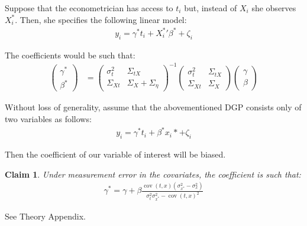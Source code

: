 \documentclass[10pt]{article}
\makeatletter
\newtheorem{claim}{Claim}
\renewenvironment{proof}[1][\proofname] {\par\pushQED{\qed}\normalfont\topsep6\p@\@plus6\p@\relax\trivlist\item[\hskip\labelsep\bfseries#1\@addpunct{.}]\ignorespaces}{\popQED\endtrivlist\@endpefalse}
\makeatother
\begin{document}
        Suppose that the econometrician has access to $t_i$ but, instead of $X_i$ she observes $X^*_i$. Then, she specifies the following linear model:
        \begin{align}
            y_i = \gamma^* t_i + {X^{*}_i}' \beta^* + \zeta_i
        \end{align}
        
        The coefficients would be such that:
        \begin{align} \label{mismeasured_coeffs}
            \left(\begin{array}{l}
        {\gamma}^* \\
        {\beta}^*
        \end{array}\right)
        & =\left(\begin{array}{cc}
        {\sigma}^2_{t} & \Sigma_{tX} \\
        \Sigma_{Xt} & {\Sigma}_{X}+{\Sigma}_{\eta}
        \end{array}\right)^{-1}\left(\begin{array}{cc}
        {\sigma}^2_{t} & \Sigma_{tX} \\
        \Sigma_{Xt} & {\Sigma}_{X}
        \end{array}\right)\left(\begin{array}{l}
        {\gamma} \\
        {\beta}
        \end{array}\right)
        \end{align}
        
        Without loss of generality, assume that the abovementioned DGP consists only of two variables as follows:
        \begin{align}
                    y_i = \gamma^* t_i +  \beta^*x_i* + \zeta_i
        \end{align}
        
        Then the coefficient of our variable of interest will be biased.
        \begin{claim}
        \label{claim:one}
        Under measurement error in the covariates, the coefficient is such that:
            \begin{align}
                \gamma^* = \gamma + \beta\frac{\operatorname{cov}(t,x)(\sigma^2_{x^*}-\sigma^2_x)}{\sigma_{t}^2\sigma_{x^*}^2-\operatorname{cov}({t,x})^2}
            \end{align}
        \end{claim}

        \begin{proof}
            See Theory Appendix.
        \end{proof}
\end{document}
